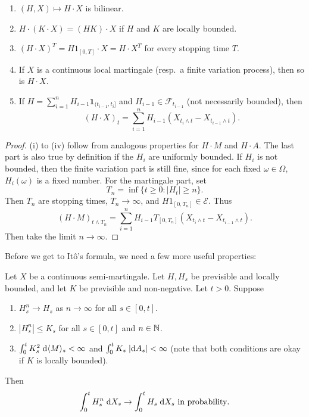 \documentclass[a4paper]{article}
\begin{document}
\begin{prop}\leavevmode
  \begin{enumerate}
    \item $(H, X) \mapsto H \cdot X$ is bilinear.
    \item $H \cdot (K \cdot X) = (HK) \cdot X$ if $H$ and $K$ are locally bounded.
    \item $(H \cdot X)^T = H1_{[0, T]} \cdot X = H \cdot X^T$ for every stopping time $T$.
    \item If $X$ is a continuous local martingale (resp.\ a finite variation process), then so is $H \cdot X$.
    \item If $H = \sum_{i = 1}^n H_{i - 1} \mathbf{1}_{(t_{i - 1}, t_i]}$ and $H_{i - 1} \in \mathcal{F}_{t_{i - 1}}$ (not necessarily bounded), then
      \[
        (H \cdot X)_t = \sum_{i = 1}^n H_{i - 1}(X_{t_i \wedge t} - X_{t_{i - 1} \wedge t}).
      \]
  \end{enumerate}
\end{prop}
\begin{proof}
  (i) to (iv) follow from analogous properties for $H \cdot M$ and $H \cdot A$. The last part is also true by definition if the $H_i$ are uniformly bounded. If $H_i$ is not bounded, then the finite variation part is still fine, since for each fixed $\omega \in \Omega$, $H_i(\omega)$ is a fixed number. For the martingale part, set
  \[
    T_n = \inf \{t \geq 0 : |H_t| \geq n\}.
  \]
  Then $T_n$ are stopping times, $T_n \to \infty$, and $H1_{[0, T_n]} \in \mathcal{E}$. Thus
  \[
    (H \cdot M)_{t \wedge T_n} = \sum_{i = 1}^n H_{i - 1} T_{[0, T_n]} (X_{t_i \wedge t} - X_{t_{i - 1}\wedge t}).
  \]
  Then take the limit $n \to \infty$.
\end{proof}

Before we get to It\^o's formula, we need a few more useful properties:
\begin{prop}
  Let $X$ be a continuous semi-martingale. Let $H, H_s$ be previsible and locally bounded, and let $K$ be previsible and non-negative. Let $t > 0$. Suppose
  \begin{enumerate}
    \item $H_s^n \to H_s$ as $n \to \infty$ for all $s \in [0, t]$.
    \item $|H_s^n| \leq K_s$ for all $s \in [0, t]$ and $n \in \mathbb{N}$.
    \item $\int_0^t K_s^2\;\mathrm{d} \langle M\rangle_s < \infty$ and $\int_0^t K_s \;|\mathrm{d} A_s|< \infty$ (note that both conditions are okay if $K$ is locally bounded).
  \end{enumerate}
  Then
  \[
    \int_0^t H_s^n \;\mathrm{d} X_s \to \int_0^t H_s\;\mathrm{d} X_s \text{ in probability}.
  \]
\end{prop}
\end{document}
